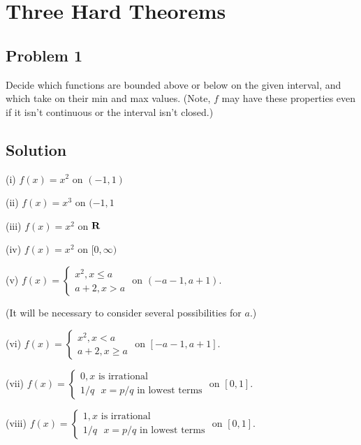 \section{Three Hard Theorems}

\subsection*{Problem 1}
Decide which functions are bounded above or below on the given
interval, and which take on their min and max values. (Note, $f$ may
have these properties even if it isn't continuous or the interval
isn't closed.)

\subsection*{Solution}

(i) $f(x)=x^{2}$ on $(-1,1)$

\vs

(ii) $f(x)=x^{3}$ on $(-1,1$

\vs

(iii) $f(x)=x^{2}$ on $\mathbf{R}$

\vs

(iv) $f(x)=x^{2}$ on $[0, \infty)$

\vs

(v) $f(x)=\begin{cases}
  x^{2}, x\leq a\\
  a+2, x>a
\end{cases}$ on $(-a-1, a+1)$.

(It will be necessary to consider several possibilities for $a$.)

\vs

(vi) $f(x)=\begin{cases}
  x^{2}, x<a\\
  a+2, x\geq a
\end{cases}$ on $[-a-1, a+1]$.

\vs

(vii) $f(x)=\begin{cases}
  0, \text{$x$ is irrational}\\
  1/q \ \ \ x=p/q \text{ in lowest terms}
\end{cases}$ on $[0, 1]$.

\vs

(viii) $f(x)=\begin{cases}
  1, \text{$x$ is irrational}\\
  1/q \ \ \ x=p/q \text{ in lowest terms}
\end{cases}$ on $[0, 1]$.

